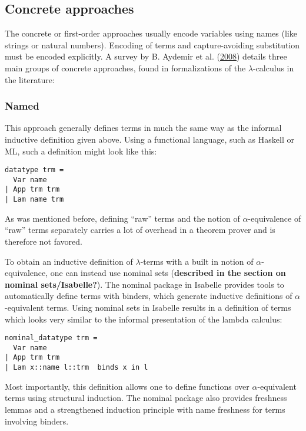 \documentclass[a4paper, 12pt, twoside]{style/ociamthesis}
\theoremstyle{plain}
\theoremstyle{definition}
\theoremstyle{remark}
\begin{document}
\subsection{Concrete approaches}\label{concrete-approaches}

The concrete or first-order approaches usually encode variables using
names (like strings or natural numbers). Encoding of terms and
capture-avoiding substitution must be encoded explicitly. A survey by B.
Aydemir et al. (\protect\hyperlink{ref-aydemir08}{2008}) details three
main groups of concrete approaches, found in formalizations of the
\(\lambda\)-calculus in the literature:

\subsubsection{Named}\label{named}

This approach generally defines terms in much the same way as the
informal inductive definition given above. Using a functional language,
such as Haskell or ML, such a definition might look like this:

\begin{verbatim}
datatype trm =
  Var name
| App trm trm
| Lam name trm
\end{verbatim}

As was mentioned before, defining ``raw'' terms and the notion of
\(\alpha\)-equivalence of ``raw'' terms separately carries a lot of
overhead in a theorem prover and is therefore not favored.

To obtain an inductive definition of \(\lambda\)-terms with a built in
notion of \(\alpha\)-equivalence, one can instead use nominal sets
(\textbf{described in the section on nominal sets/Isabelle?}). The
nominal package in Isabelle provides tools to automatically define terms
with binders, which generate inductive definitions of
\(\alpha\)-equivalent terms. Using nominal sets in Isabelle results in a
definition of terms which looks very similar to the informal
presentation of the lambda calculus:

\begin{verbatim}
nominal_datatype trm =
  Var name
| App trm trm
| Lam x::name l::trm  binds x in l
\end{verbatim}

Most importantly, this definition allows one to define functions over
\(\alpha\)-equivalent terms using structural induction. The nominal
package also provides freshness lemmas and a strengthened induction
principle with name freshness for terms involving binders.
\end{document}
